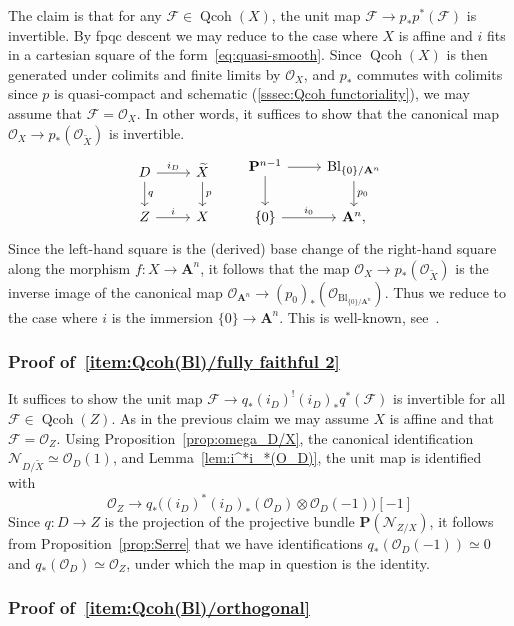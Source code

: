 \documentclass[11pt]{article}
\theoremstyle{definition}
\numberwithin{equation}{section}
\numberwithin{figure}{section}
\numberwithin{table}{section}
\newcommand{\sF}{\ensuremath{\mathcal{F}}\xspace}
\newcommand{\sN}{\ensuremath{\mathcal{N}}\xspace}
\newcommand{\sO}{\ensuremath{\mathcal{O}}\xspace}
\newcommand{\bA}{\ensuremath{\mathbf{A}}\xspace}
\newcommand{\bP}{\ensuremath{\mathbf{P}}\xspace}
\newcommand{\A}{\bA}
\renewcommand{\P}{\bP}
\DeclareMathOperator{\Qcoh}{Qcoh}
\DeclareMathOperator{\Bl}{Bl}
\begin{document}
The claim is that for any $\sF \in \Qcoh(X)$, the unit map $\sF \to p_*p^*(\sF)$ is invertible. By fpqc descent we may reduce to the case where $X$ is affine and $i$ fits in a cartesian square of the form~\eqref{eq:quasi-smooth}. Since $\Qcoh(X)$ is then generated under colimits and finite limits by $\sO_X$, and $p_*$ commutes with colimits since $p$ is quasi-compact and schematic (\ref{sssec:Qcoh functoriality}), we may assume that $\sF = \sO_X$. In other words, it suffices to show that the canonical map $\sO_X \to p_*(\sO_{\widetilde{X}})$ is invertible.
\[
\begin{tikzcd}
D \ar{r}{i_D}\ar{d}{q} & \widetilde{X}\ar{d}{p}
\\
Z \ar{r}{i} & X
\end{tikzcd}
\qquad
\begin{tikzcd}
\P^{n-1} \ar{r}\ar{d} & \Bl_{\{0\}/\A^n}\ar{d}{p_0}
\\
\{0\} \ar{r}{i_0} & \A^n,
\end{tikzcd}
\]
Since the left-hand square is the (derived) base change of the right-hand square along the morphism $f : X \to \A^n$, it follows that the map $\sO_X \to p_*(\sO_{\widetilde{X}})$ is the inverse image of the canonical map $\sO_{\A^n} \to (p_0)_*(\sO_{\Bl_{\{0\}/\A^n}})$. Thus we reduce to the case where $i$ is the immersion $\{0\} \to \A^n$. This is well-known, see~\cite[Example.~VII]{SGA6}.

\subsubsection{Proof of~\eqref{item:Qcoh(Bl)/fully faithful 2}}

It suffices to show the unit map $\sF \to q_*(i_D)^!(i_D)_*q^*(\sF)$ is invertible for all $\sF \in \Qcoh(Z)$. As in the previous claim we may assume $X$ is affine and that $\sF = \sO_Z$. Using Proposition~\ref{prop:omega_D/X}, the canonical identification $\sN_{D/\widetilde{X}} \simeq \sO_D(1)$, and Lemma~\ref{lem:i^*i_*(O_D)}, the unit map is identified with
\[
\sO_Z
\to q_*\big((i_D)^*(i_D)_*(\sO_D) \otimes \sO_D(-1)\big)[-1]
\]
Since $q : D \to Z$ is the projection of the projective bundle $\P(\sN_{Z/X})$, it follows from Proposition~\ref{prop:Serre} that we have identifications $q_*(\sO_D(-1)) \simeq 0$ and $q_*(\sO_D) \simeq \sO_Z$, under which the map in question is the identity.

\subsubsection{Proof of~\eqref{item:Qcoh(Bl)/orthogonal}}
\end{document}
